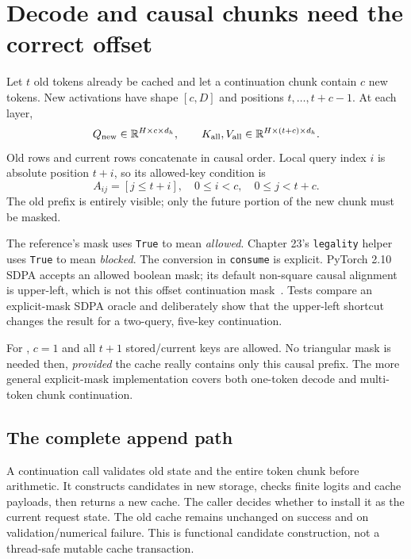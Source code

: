 \section{Decode and causal chunks need the correct offset}
\label{evod35:offset}
Let $t$ old tokens already be cached and let a continuation chunk contain $c$
new tokens. New activations have shape $[c,D]$ and positions
$t,\ldots,t+c-1$. At each layer,
\[
 Q_{\rm new}\in\mathbb R^{H\times c\times d_h},\qquad
 K_{\rm all},V_{\rm all}\in\mathbb R^{H\times(t+c)\times d_h}.
\]
Old rows and current rows concatenate in causal order. Local query index $i$
is absolute position $t+i$, so its allowed-key condition is
\[
 A_{ij}=[j\le t+i],\quad
 0\le i<c,\quad0\le j<t+c.
\]
The old prefix is entirely visible; only the future portion of the new chunk
must be masked.


The reference's mask uses \texttt{True} to mean \emph{allowed}. Chapter 23's
\texttt{legality} helper uses \texttt{True} to mean \emph{blocked}.
The conversion in \texttt{consume} is explicit. PyTorch 2.10 SDPA accepts an
allowed boolean mask; its default non-square causal alignment is upper-left,
which is not this offset continuation mask~\cite{sdpa}. Tests compare an
explicit-mask SDPA oracle and deliberately show that the upper-left shortcut
changes the result for a two-query, five-key continuation.

For , $c=1$ and all $t+1$ stored/current keys are allowed.
No triangular mask is needed then, \emph{provided} the cache really contains
only this causal prefix. The more general explicit-mask implementation covers
both one-token decode and multi-token chunk continuation.

\subsection{The complete append path}

A continuation call validates old state and the entire token chunk before
arithmetic. It constructs candidates in new storage, checks finite logits
and cache payloads, then returns a new cache. The caller decides whether to
install it as the current request state. The old cache remains unchanged on
success and on validation/numerical failure. This is functional candidate
construction, not a thread-safe mutable cache transaction.

